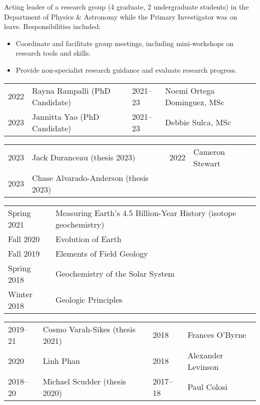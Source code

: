 Acting leader of a research group (4 graduate, 2 undergraduate students) in the Department of Physics \& Astronomy while the Primary Investigator was on leave. Responsibilities included:
\begin{itemize}
\item Coordinate and facilitate group meetings, including mini-workshops on research tools and skills.
\item Provide non-specialist research guidance and evaluate research progress.
\end{itemize}

\begin{tabular}{ll|ll}
	2022\ongoing & Rayna Rampalli (PhD Candidate) 
	&
	2021--23 & Noemi Ortega Dominguez, MSc
	\\
	2023\ongoing & Jannitta Yao (PhD Candidate)
	&
	2021--23 & Debbie Sulca, MSc
\end{tabular}
\begin{tabular}{ll | ll}
	2023 & Jack Duranceau (thesis 2023) & 2022 & Cameron Stewart\\
	2023 & Chase Alvarado-Anderson (thesis 2023)\\
\end{tabular}

\begin{tabular}{ll}
	Spring 2021 & Measuring Earth’s 4.5 Billion-Year History \normalfont(isotope geochemistry)\\
	Fall 2020 & Evolution of Earth\\
	Fall 2019 & Elements of Field Geology\\
	Spring 2018 & Geochemistry of the Solar System\\
	Winter 2018 & Geologic Principles
\end{tabular}

\begin{tabular}{ll | ll}
	2019--21 & Cosmo Varah-Sikes (thesis 2021) &
	2018 & Frances O'Byrne\\
	2020 & Linh Phan &
	2018 & Alexander Levinson \\
	2018--20 & Michael Scudder (thesis 2020) &
	2017--18 & Paul Colosi
\end{tabular}

